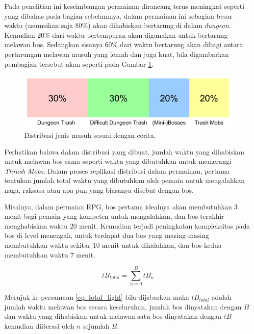 \begin{enumerate}[label=\textbf{\arabic*).}]
	Pada penelitian ini keseimbangan permainan dirancang terus meningkat seperti yang dibahas pada bagian sebelumnya, dalam permainan ini sebagian besar waktu (asumsikan saja 80\%) akan dihabiskan bertarung di dalam \textit{dungeon}. Kemudian 20\% dari waktu pertempuran akan digunakan untuk bertarung melawan bos. Sedangkan sisanya 60\% dari waktu bertarung akan dibagi antara pertarungan melawan musuh yang lemah dan juga kuat, bila digambarkan pembagian tersebut akan seperti pada Gambar \ref{fig:enemy_difficulty_percentage}.
	\vspace{1ex}
	
	\begin{figure} [!h] \centering
		\includegraphics[scale=0.15]{img/enemy_type_distribution.png}
		\caption{Distribusi jenis musuh sesuai dengan cerita.}
		\label{fig:enemy_difficulty_percentage}
	\end{figure}
	
	Perhatikan bahwa dalam distribusi yang dibuat, jumlah waktu yang dihabiskan untuk melawan bos sama seperti waktu yang dibutuhkan untuk memerangi \textit{Thrash Mobs}. Dalam proses replikasi distribusi dalam permainan, pertama tentukan jumlah total waktu yang dibutuhkan oleh pemain untuk mengalahkan naga, raksasa atau apa pun yang biasanya disebut dengan bos.
	\vspace{1ex}
	
	Misalnya, dalam permaian RPG, bos pertama idealnya akan membutuhkan 3 menit bagi pemain yang kompeten untuk mengalahkan, dan bos terakhir menghabiskan waktu 20 menit. Kemudian terjadi peningkatan kompleksitas pada bos di level menengah, untuk terdapat dua bos yang masing-masing membutuhkan waktu sekitar 10 menit untuk dikalahkan, dan bos kedua membutuhkan waktu 7 menit.
	
	\begin{equation}
	\label{eq: total_fight}
	tB_{total} = \sum_{n = 0}^{B} tB_{n}
	\end{equation}
	
	Merujuk ke persamaan \ref{eq: total_fight} bila dijabarkan maka $tB_{total}$ adalah jumlah waktu melawan bos secara keseluruhan, jumlah bos dinyatakan dengan $B$ dan waktu yang dihabiskan untuk melawan satu bos dinyatakan dengan $tB$ kemudian diiterasi oleh $n$ sejumlah $B$.
	\vspace{1ex}
	

\end{enumerate}

